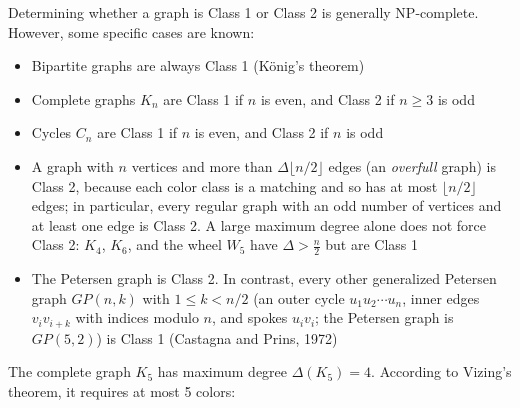 \documentclass{article}
\theoremstyle{definition}
\begin{document}
Determining whether a graph is Class 1 or Class 2 is generally NP-complete. However, some specific cases are known:

\begin{itemize}
    \item Bipartite graphs are always Class 1 (König's theorem)
    \item Complete graphs $K_n$ are Class 1 if $n$ is even, and Class 2 if $n \geq 3$ is odd
    \item Cycles $C_n$ are Class 1 if $n$ is even, and Class 2 if $n$ is odd
    \item A graph with $n$ vertices and more than $\Delta \lfloor n/2 \rfloor$ edges (an \emph{overfull} graph) is Class 2, because each color class is a matching and so has at most $\lfloor n/2 \rfloor$ edges; in particular, every regular graph with an odd number of vertices and at least one edge is Class 2. A large maximum degree alone does not force Class 2: $K_4$, $K_6$, and the wheel $W_5$ have $\Delta > \frac{n}{2}$ but are Class 1
    \item The Petersen graph is Class 2. In contrast, every other generalized Petersen graph $GP(n,k)$ with $1 \leq k < n/2$ (an outer cycle $u_1 u_2 \cdots u_n$, inner edges $v_i v_{i+k}$ with indices modulo $n$, and spokes $u_i v_i$; the Petersen graph is $GP(5,2)$) is Class 1 (Castagna and Prins, 1972)
\end{itemize}

The complete graph $K_5$ has maximum degree $\Delta(K_5) = 4$. According to Vizing's theorem, it requires at most 5 colors:

\begin{center}
\noindent\begin{minipage}{\linewidth}\centering
{}
\label{fig:k5-edge-coloring}
\end{minipage}
\end{center}
\end{document}
